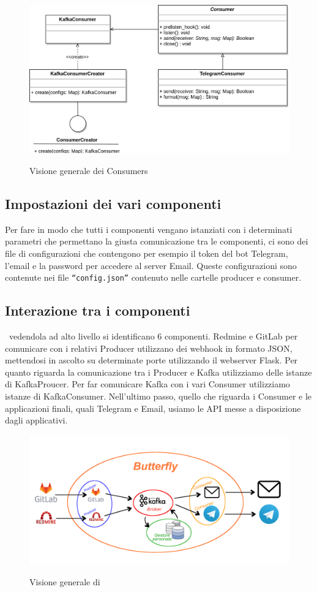 \begin{figure}[H]
    \centering
    \includegraphics[width=\textwidth]{img/Consumers.png}\\
    \caption{Visione generale dei Consumers}
    \label{fig:consumers}
\end{figure}

\subsection{Impostazioni dei vari componenti}

Per fare in modo che tutti i componenti vengano istanziati con i determinati parametri che permettano la giusta comunicazione tra le componenti,
ci sono dei file di configurazioni che contengono per esempio il token del bot Telegram, l'email e la password per accedere al server Email. Queste configurazioni
sono contenute nei file \texttt{``config.json''} contenuto nelle cartelle producer e consumer.

\subsection{Interazione tra i componenti}

\progetto\ vedendola ad alto livello si identificano 6 componenti. Redmine e GitLab per comunicare con i relativi Producer utilizzano dei webhook in formato JSON,
mettendosi in ascolto su determinate porte utilizzando il webserver Flask. Per quanto riguarda la comunicazione tra i Producer e Kafka utilizziamo delle istanze
di KafkaProucer. Per far comunicare Kafka con i vari Consumer utilizziamo istanze di KafkaConsumer. Nell'ultimo passo, quello che riguarda i Consumer e le applicazioni finali, quali Telegram e Email, usiamo le API messe a disposizione dagli applicativi.

\begin{figure}[H]
    \centering
    \includegraphics[width=\textwidth]{img/butterfly.png}\\
    \caption{Visione generale di \progetto}
    \label{fig:butterfly}
\end{figure}






